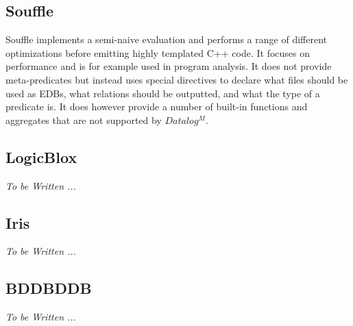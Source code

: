 \subsection{Souffle}
Souffle implements a semi-naive evaluation\cite{Green:2013:DRQ:2688167.2688168} and performs a range of different optimizations before emitting highly templated C++ code\cite{Scholz:2016:FLP:2892208.2892226}. It focuses on performance and is for example used in program analysis\cite{Smaragdakis:2010:UDF:2185923.2185939}. It does not provide meta-predicates but instead uses special directives to declare what files should be used as EDBs, what relations should be outputted, and what the type of a predicate is. It does however provide a number of built-in functions and aggregates that are not supported by $Datalog^M$\cite{SouffleHome}.

\subsection{LogicBlox}
\textit{To be Written ... }
\subsection{Iris}
\textit{To be Written ... }
\subsection{BDDBDDB}
\textit{To be Written ... }